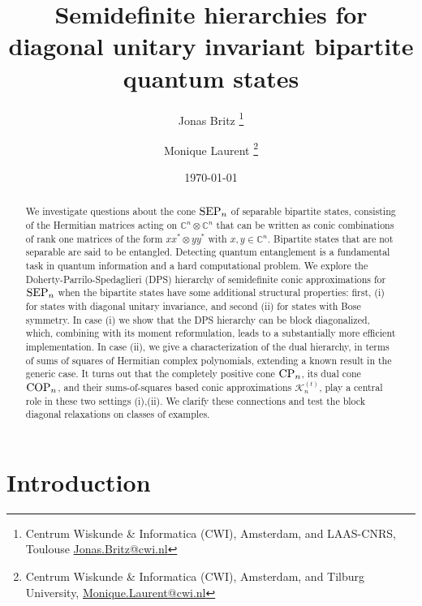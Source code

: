 \documentclass[11pt]{article}
\title{Semidefinite hierarchies for diagonal unitary invariant bipartite quantum states}
\author{Jonas Britz \thanks{Centrum Wiskunde \& Informatica (CWI), Amsterdam, and LAAS-CNRS, Toulouse \url{Jonas.Britz@cwi.nl}}
\and Monique Laurent \thanks{Centrum Wiskunde \& Informatica (CWI), Amsterdam, and Tilburg University, \url{Monique.Laurent@cwi.nl}}
}
\date{\today}
\newcommand{\C}{\ensuremath{\mathbb{C}}} %
\newcommand{\MK}{{\mathcal K}}
\newcommand{\SEP}{\text{\rm SEP}}
\newcommand{\CP}{\text{\rm CP}}
\newcommand{\COP}{\text{\rm COP}}
\newcommand{\ot}{\otimes}
\theoremstyle{plain}
\begin{document}
\maketitle

%

\begin{abstract}
We investigate questions about the cone $\SEP_n$ of separable bipartite states, consisting of the Hermitian matrices acting on   $\C^n\ot\C^n$ that can be written as conic combinations of rank one matrices of the form $xx^*\ot yy^*$ with $x,y\in\C^n$. %
Bipartite states that are not separable are said to be  entangled. Detecting quantum entanglement is a fundamental task in quantum information and a hard computational problem. We explore the Doherty-Parrilo-Spedaglieri (DPS) hierarchy of semidefinite conic approximations for $\SEP_n$ when the bipartite states have some additional structural properties: first, (i)  for states with diagonal unitary invariance, and second (ii) for states with Bose symmetry. In   case (i) we show that the DPS hierarchy can be block diagonalized, which, combining with its moment reformulation,  leads to a substantially more efficient implementation. In case (ii), we give a characterization of the dual hierarchy, in terms of %
sums of squares of Hermitian complex polynomials, extending a known result in the generic case. It turns out that the completely positive cone $\CP_n$, its dual cone $\COP_n$, and their sums-of-squares based conic approximations $\MK^{(t)}_n$, play a central role in these two settings (i),(ii). We clarify these connections and test the block diagonal relaxations on   classes of examples.
\end{abstract}


\tableofcontents

\section{Introduction}\label{sec:introduction}
\end{document}
